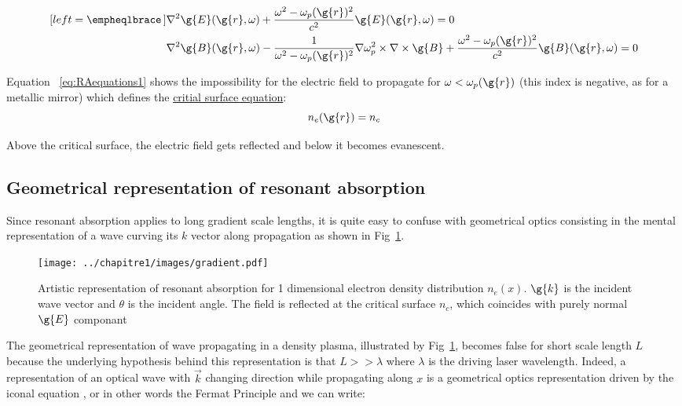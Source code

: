 \begin{subequations}
\label{eq:RAequations}
\begin{align}[left = \empheqlbrace\,]
     &\nabla^2 \g{E}(\g{r},\omega) +  \frac{\omega^2-\omega_p(\g{r})^2}{c^2}\g{E}(\g{r},\omega)=0 \label{eq:RAequations1}\\
     &\nabla^2 \g{B}(\g{r},\omega) - \frac{1}{\omega^2-\omega_p(\g{r})^2}\nabla \omega_p^2 \times \nabla\times \g{B}+ \frac{\omega^2-\omega_p(\g{r})^2}{c^2} \g{B}(\g{r},\omega) =0 \label{eq:RAequations2}
\end{align}
\end{subequations}

\noindent Equation ~\ref{eq:RAequations1} shows the impossibility for the electric field to propagate for $\omega < \omega_p(\g{r})$ (this index is negative, as for a metallic mirror) which defines the \underline{critial surface equation}:
$$
n_e(\g{r})=n_c
$$ 

\noindent Above the critical surface, the electric field gets reflected and below it becomes evanescent.

\subsection{Geometrical representation of resonant absorption}

Since resonant absorption applies to long gradient scale lengths, it is quite easy to confuse with geometrical optics consisting in the mental representation of a wave curving its $k$ vector along propagation as shown in Fig~\ref{fig:gradient}.

\begin{figure}[H]
\begin{center}
\texttt{[image: ../chapitre1/images/gradient.pdf]}\\
\caption{\label{fig:gradient} Artistic representation of resonant absorption for 1 dimensional electron density distribution $n_e(x)$. $\g{k}$ is the incident wave vector and $\theta$ is the incident angle. The field is reflected at the critical surface $n_c$, which coincides with purely normal $\g{E}$ componant}
\end{center}
\end{figure}

\noindent The geometrical representation of wave propagating in a density plasma, illustrated by Fig~\ref{fig:gradient}, becomes false for short scale length $L$ because the underlying hypothesis behind this representation is that $L >> \lambda$ where $\lambda$ is the driving laser wavelength. Indeed, a representation of an optical wave with $\vec{k}$ changing direction while propagating along $x$ is a geometrical optics representation driven by the iconal equation \cite{LandauLip}, or in other words the Fermat Principle and we can write:

